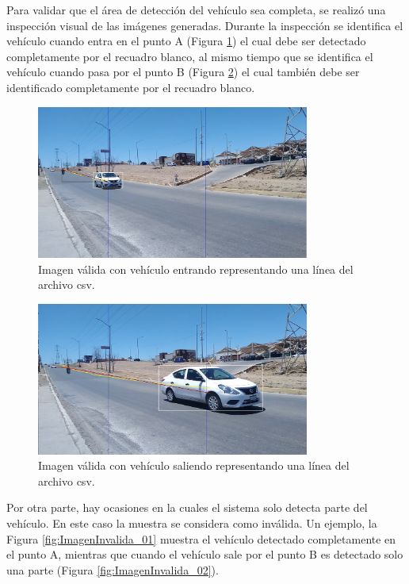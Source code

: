 Para validar que el área de detección del vehículo sea completa, se realizó una inspección visual de las imágenes generadas. Durante la inspección se identifica
el vehículo cuando entra en el punto A (Figura \ref{fig:ImagenValida01}) el cual debe ser detectado completamente por el recuadro blanco, al mismo tiempo que se identifica el vehículo cuando pasa por el punto B (Figura \ref{fig:ImagenValida02}) el cual también debe ser identificado completamente por el recuadro blanco.


\begin{figure}[H]
    \centering
    \includegraphics[width=0.8\textwidth]{Metodologia/imgs/Valido_001.jpg}
    \caption{Imagen válida con vehículo entrando representando una línea del archivo csv.}
    \label{fig:ImagenValida01}
\end{figure}

\begin{figure}[H]
    \centering
    \includegraphics[width=0.8\textwidth]{Metodologia/imgs/Valido_002.jpg}
    \caption{Imagen válida con vehículo saliendo representando una línea del archivo csv.}
    \label{fig:ImagenValida02}
\end{figure}

Por otra parte, hay ocasiones en la cuales el sistema solo detecta parte del vehículo. En este caso la muestra se considera como inválida. Un ejemplo, la Figura \ref{fig:ImagenInvalida_01} muestra el vehículo detectado completamente en el punto A, mientras que cuando el vehículo sale por el punto B es detectado solo una parte (Figura \ref{fig:ImagenInvalida_02}).

